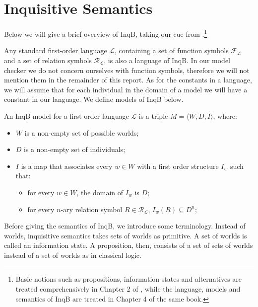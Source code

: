 \section{Inquisitive Semantics}\label{sec: InqB}
Below we will give a brief overview of \textsf{InqB}, taking our cue from \cite{inquisitive19}.\footnote{Basic notions such as propositions, information states and alternatives are treated comprehensively in Chapter 2 of \cite{inquisitive19}, while the language, models and semantics of \textsf{InqB} are treated in Chapter 4 of the same book.}

Any standard first-order language $\mathcal{L}$, containing a set of function symbols $\mathcal{F}_\mathcal{L}$ and a set of relation symbols $\mathcal{R}_\mathcal{L}$, is also a language of \textsf{InqB}. In our model checker we do not concern ourselves with function symbols, therefore we will not mention them in the remainder of this report. As for the constants in a language, we will assume that for each individual in the domain of a model we will have a constant in our language. We define models of \textsf{InqB} below.

\begin{defi}\label{def: InqBModel}
An \textsf{InqB} model for a first-order language $\mathcal{L}$ is a triple $M=\langle W,D,I\rangle$, where:
\begin{itemize}
\setlength\itemsep{-0.3em}
    \item $W$ is a non-empty set of possible worlds;
    \item $D$ is a non-empty set of individuals;
    \item $I$ is a map that associates every $w\in W$ with a first order structure $I_w$ such that:
    \begin{itemize}
    \setlength\itemsep{-0.3em}
        \item for every $w\in W$, the domain of $I_w$ is $D$;
        \item for every $n$-ary relation symbol $R\in \mathcal{R}_{\mathcal{L}}$, $I_w(R)\subseteq D^n$;
    \end{itemize}
\end{itemize}
\end{defi}

Before giving the semantics of \textsf{InqB}, we introduce some terminology. Instead of worlds, inquisitive semantics takes sets of worlds as primitive. A set of worlds is called an information state. A proposition, then, consists of a set of sets of worlds instead of a set of worlds as in classical logic.

